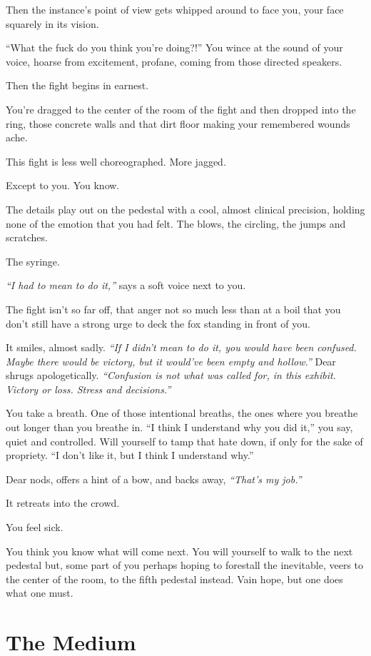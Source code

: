 Then the instance's point of view gets whipped around to face you, your face squarely in its vision.

``What the fuck do you think you're doing?!'' You wince at the sound of your voice, hoarse from excitement, profane, coming from those directed speakers.

Then the fight begins in earnest.

You're dragged to the center of the room of the fight and then dropped into the ring, those concrete walls and that dirt floor making your remembered wounds ache.

This fight is less well choreographed. More jagged.

Except to you. You know.

The details play out on the pedestal with a cool, almost clinical precision, holding none of the emotion that you had felt. The blows, the circling, the jumps and scratches.

The syringe.

\emph{``I had to mean to do it,''} says a soft voice next to you.

The fight isn't so far off, that anger not so much less than at a boil that you don't still have a strong urge to deck the fox standing in front of you.

It smiles, almost sadly. \emph{``If I didn't mean to do it, you would have been confused. Maybe there would be victory, but it would've been empty and hollow.''} Dear shrugs apologetically. \emph{``Confusion is not what was called for, in this exhibit. Victory or loss. Stress and decisions.''}

You take a breath. One of those intentional breaths, the ones where you breathe out longer than you breathe in. ``I think I understand why you did it,'' you say, quiet and controlled. Will yourself to tamp that hate down, if only for the sake of propriety. ``I don't like it, but I think I understand why.''

Dear nods, offers a hint of a bow, and backs away, \emph{``That's my job.''}

It retreats into the crowd.

You feel sick.

You think you know what will come next. You will yourself to walk to the next pedestal but, some part of you perhaps hoping to forestall the inevitable, veers to the center of the room, to the fifth pedestal instead. Vain hope, but one does what one must.

\newpage
\section*{The Medium}

